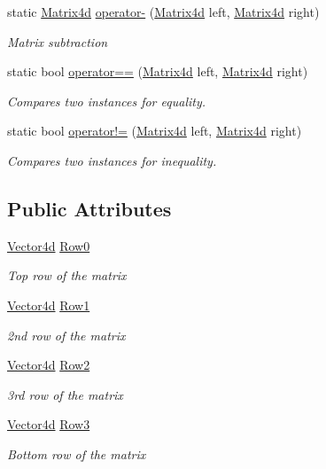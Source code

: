 \begin{DoxyCompactItemize}
static \hyperlink{struct_open_t_k_1_1_matrix4d}{Matrix4d} \hyperlink{struct_open_t_k_1_1_matrix4d_a0c736f13ac1288a35ac123ab2c6d8ee3}{operator-\/} (\hyperlink{struct_open_t_k_1_1_matrix4d}{Matrix4d} left, \hyperlink{struct_open_t_k_1_1_matrix4d}{Matrix4d} right)
\begin{DoxyCompactList}\small\item\em Matrix subtraction \end{DoxyCompactList}\item 
static bool \hyperlink{struct_open_t_k_1_1_matrix4d_a132cfa86d09377bbc7937e770f9d3f52}{operator==} (\hyperlink{struct_open_t_k_1_1_matrix4d}{Matrix4d} left, \hyperlink{struct_open_t_k_1_1_matrix4d}{Matrix4d} right)
\begin{DoxyCompactList}\small\item\em Compares two instances for equality. \end{DoxyCompactList}\item 
static bool \hyperlink{struct_open_t_k_1_1_matrix4d_a54adbfd10edb114a1c1c4c4b185b0daf}{operator!=} (\hyperlink{struct_open_t_k_1_1_matrix4d}{Matrix4d} left, \hyperlink{struct_open_t_k_1_1_matrix4d}{Matrix4d} right)
\begin{DoxyCompactList}\small\item\em Compares two instances for inequality. \end{DoxyCompactList}\end{DoxyCompactItemize}
\subsection*{Public Attributes}
\begin{DoxyCompactItemize}
\item 
\hyperlink{struct_open_t_k_1_1_vector4d}{Vector4d} \hyperlink{struct_open_t_k_1_1_matrix4d_adb270927a2e4ecfe812e95c2adc6a441}{Row0}
\begin{DoxyCompactList}\small\item\em Top row of the matrix \end{DoxyCompactList}\item 
\hyperlink{struct_open_t_k_1_1_vector4d}{Vector4d} \hyperlink{struct_open_t_k_1_1_matrix4d_a25aaaff5953b88c33220af8cdf8f7530}{Row1}
\begin{DoxyCompactList}\small\item\em 2nd row of the matrix \end{DoxyCompactList}\item 
\hyperlink{struct_open_t_k_1_1_vector4d}{Vector4d} \hyperlink{struct_open_t_k_1_1_matrix4d_ac0eab4c78c7af0f1532aaefb40078ef5}{Row2}
\begin{DoxyCompactList}\small\item\em 3rd row of the matrix \end{DoxyCompactList}\item 
\hyperlink{struct_open_t_k_1_1_vector4d}{Vector4d} \hyperlink{struct_open_t_k_1_1_matrix4d_aea87805ef21d4b14fd0a2fb32cb4475a}{Row3}
\begin{DoxyCompactList}\small\item\em Bottom row of the matrix \end{DoxyCompactList}\end{DoxyCompactItemize}
